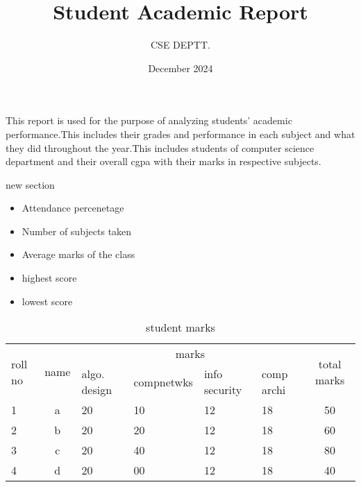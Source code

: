 \documentclass{article}
\title{\textbf{Student Academic Report}}
\author{CSE DEPTT.}
\date{December 2024}
\begin{document}
\maketitle
\noindent
This report is used for the purpose of analyzing students' academic performance.This includes their grades and performance in each subject and what they did throughout the year.This includes students of computer science department and their overall cgpa with their marks in respective subjects.
\begin{section}{new section}
    \begin{itemize}
        \item Attendance percenetage
        \item Number of subjects taken
        \item Average marks of the class
        \item highest score
        \item lowest score
    \end{itemize}
    \begin{table}[h]
    \centering
        \caption{student marks}
        \begin{tabular}{|p{1cm}|c|p{1.9cm}|p{1.9cm}|p{1.9cm}|p{1.9cm}|c|}
            \hline
            \multirow{2}{*}{roll no} & \multirow{2}{*}{name} & \multicolumn{4}{c|}{marks} & \multirow{2}{*}{total marks}            \\
            \cline{3-6}
             & & algo. design & compnetwks & info security & comp archi & \\
             \hline
             1 & a & 20 &10 & 12 & 18 & 50 \\
             \hline
             2 & b & 20 &20 & 12 & 18 & 60 \\
             \hline
             3 & c & 20 &40 & 12 & 18 & 80 \\
             \hline
             4 & d & 20 &00 & 12 & 18 & 40 \\
             \hline
        \end{tabular}
    \end{table}
\end{section}
    
\end{document}
